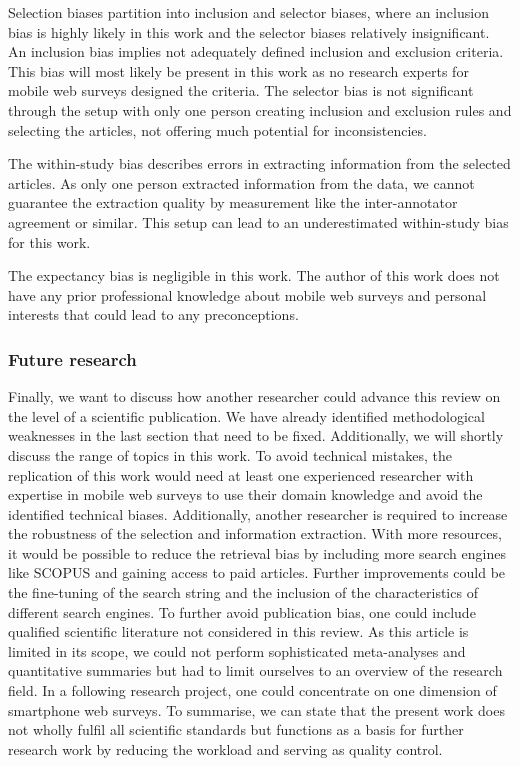 Selection biases partition into inclusion and selector biases, where an inclusion bias is highly likely in this work and the selector biases relatively insignificant. An inclusion bias implies not adequately defined inclusion and exclusion criteria. This bias will most likely be present in this work as no research experts for mobile web surveys designed the criteria. The selector bias is not significant through the setup with only one person creating inclusion and exclusion rules and selecting the articles, not offering much potential for inconsistencies.

The within-study bias describes errors in extracting information from the selected articles. As only one person extracted information from the data, we cannot guarantee the extraction quality by measurement like the inter-annotator agreement or similar. This setup can lead to an underestimated within-study bias for this work.

The expectancy bias is negligible in this work. The author of this work does not have any prior professional knowledge about mobile web surveys and personal interests that could lead to any preconceptions.

\subsubsection{Future research}
Finally, we want to discuss how another researcher could advance this review on the level of a scientific publication. We have already identified methodological weaknesses in the last section that need to be fixed. Additionally, we will shortly discuss the range of topics in this work. To avoid technical mistakes, the replication of this work would need at least one experienced researcher with expertise in mobile web surveys to use their domain knowledge and avoid the identified technical biases. Additionally, another researcher is required to increase the robustness of the selection and information extraction. With more resources, it would be possible to reduce the retrieval bias by including more search engines like SCOPUS and gaining access to paid articles. Further improvements could be the fine-tuning of the search string and the inclusion of the characteristics of different search engines. To further avoid publication bias, one could include qualified scientific literature not considered in this review. As this article is limited in its scope, we could not perform sophisticated meta-analyses and quantitative summaries but had to limit ourselves to an overview of the research field. In a following research project, one could concentrate on one dimension of smartphone web surveys. To summarise, we can state that the present work does not wholly fulfil all scientific standards but functions as a basis for further research work by reducing the workload and serving as quality control. 